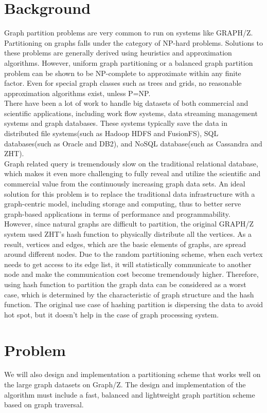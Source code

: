 \documentclass[10pt]{article}
\begin{document}
\begin{multicols}{2} 
  \section{Background}
  Graph partition problems are very common to run on systems like GRAPH/Z. Partitioning on graphs falls under the category of NP-hard problems. Solutions to these problems are generally derived using heuristics and approximation algorithms. However, uniform graph partitioning or a balanced graph partition problem can be shown to be NP-complete to approximate within any finite factor. Even for special graph classes such as trees and grids, no reasonable approximation algorithms exist, unless P=NP.\\
  There have been a lot of work to handle big datasets of both commercial and scientific applications, including work flow systems, data streaming management systems and graph databases. These systems typically save the data in distributed file systems(such as Hadoop HDFS and FusionFS), SQL databases(such as Oracle and DB2), and NoSQL database(such as Cassandra and ZHT).\\
  Graph related query is tremendously slow on the traditional relational database, which makes it even more challenging to fully reveal and utilize the scientific and commercial value from the continuously increasing graph data sets. An ideal solution for this problem is to replace the traditional data infrastructure with a graph-centric model, including storage and computing, thus to better serve graph-based applications in terms of performance and programmability.\\
  However, since natural graphs are difficult to partition, the original GRAPH/Z system used ZHT’s hash function to physically distribute all the vertices. As a result, vertices and edges, which are the basic elements of graphs, are spread around different nodes. Due to the random partitioning scheme, when each vertex needs to get access to its edge list, it will statistically communicate to another node and make the communication cost become tremendously higher. Therefore, using hash function to partition the graph data can be considered as a worst case, which is determined by the characteristic of graph structure and the hash function. The original use case of hashing partition is dispersing the data to avoid hot spot, but it doesn’t help in the case of graph processing system.
  
  \section{Problem}
  We will also design and implementation a partitioning scheme that works well on the large graph datasets on Graph/Z. The design and implementation of the algorithm must include a fast, balanced and lightweight graph partition scheme based on graph traversal.

\end{multicols}
\end{document}
